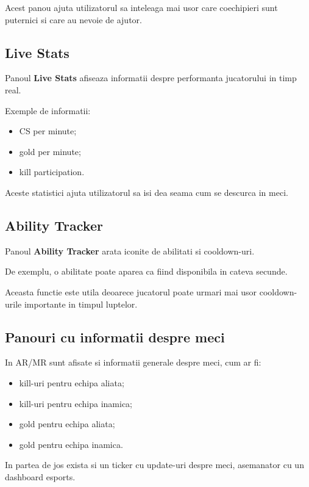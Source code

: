 \documentclass[12pt,a4paper]{article}
\begin{document}
Acest panou ajuta utilizatorul sa inteleaga mai usor care coechipieri sunt puternici si care au nevoie de ajutor.

\subsection{Live Stats}

Panoul \textbf{Live Stats} afiseaza informatii despre performanta jucatorului in timp real.

Exemple de informatii:

\begin{itemize}
    \item CS per minute;
    \item gold per minute;
    \item kill participation.
\end{itemize}

Aceste statistici ajuta utilizatorul sa isi dea seama cum se descurca in meci.

\subsection{Ability Tracker}

Panoul \textbf{Ability Tracker} arata iconite de abilitati si cooldown-uri.

De exemplu, o abilitate poate aparea ca fiind disponibila in cateva secunde.

Aceasta functie este utila deoarece jucatorul poate urmari mai usor cooldown-urile importante in timpul luptelor.

\subsection{Panouri cu informatii despre meci}

In AR/MR sunt afisate si informatii generale despre meci, cum ar fi:

\begin{itemize}
    \item kill-uri pentru echipa aliata;
    \item kill-uri pentru echipa inamica;
    \item gold pentru echipa aliata;
    \item gold pentru echipa inamica.
\end{itemize}

In partea de jos exista si un ticker cu update-uri despre meci, asemanator cu un dashboard esports.
\end{document}
